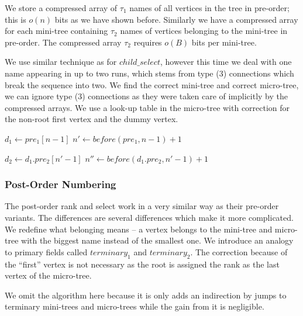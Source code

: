 We store a compressed array of $\tau_1$ names of all vertices in the tree in pre-order; this is $o(n)$ bits as we have shown before.
Similarly we have a compressed array for each mini-tree containing $\tau_2$ names of vertices belonging to the mini-tree in pre-order.
The compressed array $\tau_2$ requires $o(B)$ bits per mini-tree.

We use similar technique as for $child\_select$, however this time we deal with one name appearing in up to two runs, which stems from type (3) connections which break the sequence into two.
We find the correct mini-tree and correct micro-tree, we can ignore type (3) connections as they were taken care of implicitly by the compressed arrays.
We use a look-up table in the micro-tree with correction for the non-root first vertex and the dummy vertex.

\begin{algorithmic}
	\State $d_1 \gets pre_1[n - 1]$ 
	\State $n' \gets before(pre_1, n - 1) + 1$

	\State $d_2 \gets d_1.pre_2[n' - 1]$ 
	\State $n'' \gets before(d_1.pre_2, n' - 1) + 1$
	
	 
	\State {}
\EndFunction
\end{algorithmic}

\subsubsection{Post-Order Numbering}

The post-order rank and select work in a very similar way as their pre-order variants.
The differences are several differences which make it more complicated.
We redefine what belonging means -- a vertex belongs to the mini-tree and micro-tree with the biggest name instead of the smallest one.
We introduce an analogy to primary fields called $terminary_1$ and $terminary_2$.
The correction because of the ``first'' vertex is not necessary as the root is assigned the rank as the last vertex of the micro-tree.

We omit the algorithm here because it is only adds an indirection by jumps to terminary mini-trees and micro-trees while the gain from it is negligible.


